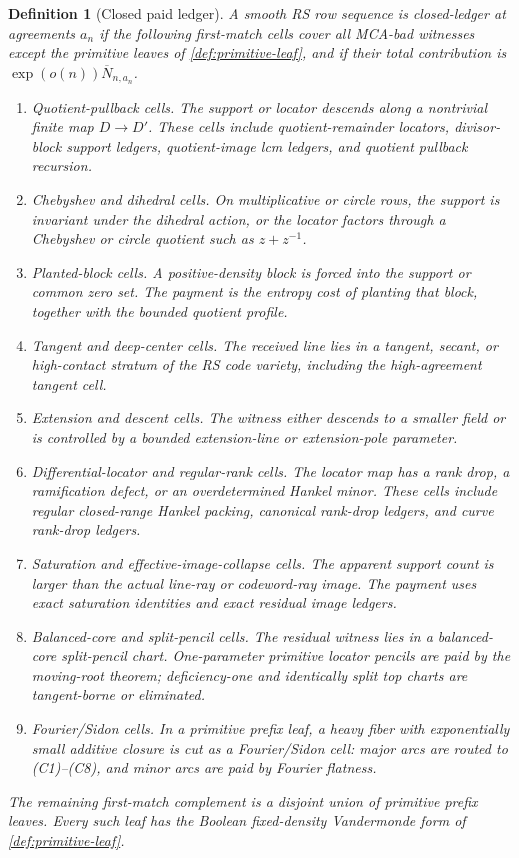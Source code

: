 \documentclass[11pt,a4paper]{amsart}
\numberwithin{equation}{section}
\newtheorem{definition}[theorem]{Definition}
\theoremstyle{remark}
\newcommand{\barN}{\overline N}
\begin{document}
\begin{definition}[Closed paid ledger]\label{def:closed-ledger}
A smooth RS row sequence is \emph{closed-ledger} at agreements \(a_n\) if the following first-match cells cover all MCA-bad witnesses except the primitive leaves of \cref{def:primitive-leaf}, and if their total contribution is \(\exp(o(n))\barN_{n,a_n}\).
\begin{enumerate}[label=\textup{(C\arabic*)},leftmargin=2.7em]
    \item \emph{Quotient-pullback cells.}  The support or locator descends along a nontrivial finite map \(D\to D'\).  These cells include quotient-remainder locators, divisor-block support ledgers, quotient-image lcm ledgers, and quotient pullback recursion.
    \item \emph{Chebyshev and dihedral cells.}  On multiplicative or circle rows, the support is invariant under the dihedral action, or the locator factors through a Chebyshev or circle quotient such as \(z+z^{-1}\).
    \item \emph{Planted-block cells.}  A positive-density block is forced into the support or common zero set.  The payment is the entropy cost of planting that block, together with the bounded quotient profile.
    \item \emph{Tangent and deep-center cells.}  The received line lies in a tangent, secant, or high-contact stratum of the RS code variety, including the high-agreement tangent cell.
    \item \emph{Extension and descent cells.}  The witness either descends to a smaller field or is controlled by a bounded extension-line or extension-pole parameter.
    \item \emph{Differential-locator and regular-rank cells.}  The locator map has a rank drop, a ramification defect, or an overdetermined Hankel minor.  These cells include regular closed-range Hankel packing, canonical rank-drop ledgers, and curve rank-drop ledgers.
    \item \emph{Saturation and effective-image-collapse cells.}  The apparent support count is larger than the actual line-ray or codeword-ray image.  The payment uses exact saturation identities and exact residual image ledgers.
    \item \emph{Balanced-core and split-pencil cells.}  The residual witness lies in a balanced-core split-pencil chart.  One-parameter primitive locator pencils are paid by the moving-root theorem; deficiency-one and identically split top charts are tangent-borne or eliminated.
    \item \emph{Fourier/Sidon cells.}  In a primitive prefix leaf, a heavy fiber with exponentially small additive closure is cut as a Fourier/Sidon cell: major arcs are routed to \textup{(C1)--(C8)}, and minor arcs are paid by Fourier flatness.
\end{enumerate}
The remaining first-match complement is a disjoint union of primitive prefix leaves.  Every such leaf has the Boolean fixed-density Vandermonde form of \cref{def:primitive-leaf}.
\end{definition}
\end{document}
